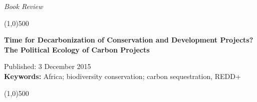 \documentclass[10pt,a4paper]{article}
\begin{document}
\flushcolumns
\raggedcolumns



\pagestyle{document}
\thispagestyle{firstpage}


\vspace*{50pt}
\setlength{\parindent}{0cm}

\textit{Book Review}
\vspace*{-12pt}

\begin{center}
\line(1,0){500}
\end{center}

\vspace*{6pt}
\begin{flushleft}
\begin{LARGE}
\textbf{{\color{librelloCOLOR} Time for Decarbonization of Conservation and Development Projects? The Political Ecology of Carbon Projects }}\\
\end{LARGE}
\vspace*{6pt}
Published: 3 December 2015\\
\vspace*{6pt}
\textbf{{\color{librelloCOLOR}Keywords:}} Africa; biodiversity conservation; carbon sequestration, REDD+
\end{flushleft}

\vspace*{-18pt}
\begin{center}
\line(1,0){500}
\end{center}
\setcounter{page}{16}

\vspace*{12mm}
\end{document}
